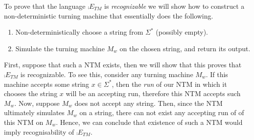 \begin{soln}
To prove that the language $\comp{E_{TM}}$ is \emph{recognizable} we will show how to construct a non-deterministic turning machine that essentially does the following.
\begin{enumerate}
    \item Non-deterministically choose a string from $\Sigma^*$ (possibly empty).
    \item Simulate the turning machine $M_w$ on the chosen string, and return its output.
\end{enumerate}
First, suppose that such a NTM exists, then we will show that this proves that $\comp{E_{TM}}$ is recognizable.
To see this, consider any turning machine $M_w$. If this machine accepts some string $x \in \Sigma^*$,
then the \emph{run} of our NTM in which it chooses the string $x$ will be an accepting run, therefore this NTM accepts such $M_w$.
Now, suppose $M_w$ does not accept any string. Then, since the NTM ultimately simulates $M_w$ on a string, there can not exist any accepting run of of this NTM on $M_w$.
Hence, we can conclude that existence of such a NTM would imply recognisability of $\comp{E_{TM}}$.\\


\end{soln}
